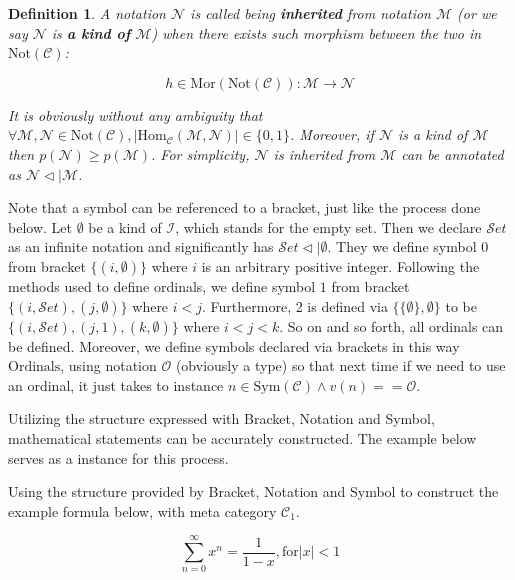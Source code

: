 \documentclass{article}
\newtheorem{definition}{Definition}
\begin{document}
\begin{definition}
	A notation \(\mathcal{N}\) is called being \textbf{ inherited} from notation \(\mathcal{M}\) (or we say \(\mathcal{N}\) is\textbf{  a kind of} \(\mathcal{M}\)) when there exists such morphism between the two in \(\text{Not}(\mathcal{C})\):
	
	\[h\in \text{Mor}(\text{Not}(\mathcal{C})): \mathcal{M}\to \mathcal{N}\]
	
	It is obviously without any ambiguity that \(\forall \mathcal{M},\mathcal{N}\in \text{Not}(\mathcal{C}),\left|\text{Hom}_{\mathcal{C}}(\mathcal{M},\mathcal{N})\right|\in \{0,1\}\). Moreover, if \(\mathcal{N}\) is a kind of \(\mathcal{M}\) then \(\mathit{p}(\mathcal{N})\geq \mathit{p}(\mathcal{M})\). For simplicity, \(\mathcal{N}\) is inherited from \(\mathcal{M}\) can be annotated as \(\mathcal{N}\triangleleft |\mathcal{M}\).
\end{definition}

Note that a symbol can be referenced to a bracket, just like the process done below. Let \(\emptyset\) be a kind of \(\mathcal{I}\), which stands for the empty set. Then we declare \(\mathcal{S}\mathit{e}\mathit{t}\) as an infinite notation and significantly has \(\mathcal{S}\mathit{e}\mathit{t}\triangleleft |\emptyset\). They we define symbol \(0\) from bracket \(\{(i,\emptyset )\}\) where \(i\) is an arbitrary positive integer. Following the methods used to define ordinals, we define symbol \(1\) from bracket \(\{(i,\mathcal{S}\mathit{e}\mathit{t}),(j,\emptyset )\}\) where \(i<j\). Furthermore, 2 is defined via \(\{\{\emptyset \},\emptyset \}\) to be \(\{(i,\mathcal{S}\mathit{e}\mathit{t}),(j,1),(k,\emptyset )\}\) where \(i<j<k\). So on and so forth, all ordinals can be defined. Moreover, we define symbols declared via brackets in this way \(\text{Ordinals}\), using notation \(\mathcal{O}\) (obviously a type) so that next time if we need to use an ordinal, it just takes to instance \(n\in \text{Sym}(\mathcal{C})\land \mathit{v}(n)==\mathcal{O}\).

Utilizing the structure expressed with Bracket, Notation and Symbol, mathematical statements can be accurately constructed. The example below serves as a instance for this process.

Using the structure provided by Bracket, Notation and Symbol to construct the example formula below, with meta category \(\mathcal{C}_1\).

\[\sum _{n=0}^{\infty } x^n=\frac{1}{1-x}, \text{for} |x|<1\]
\end{document}
